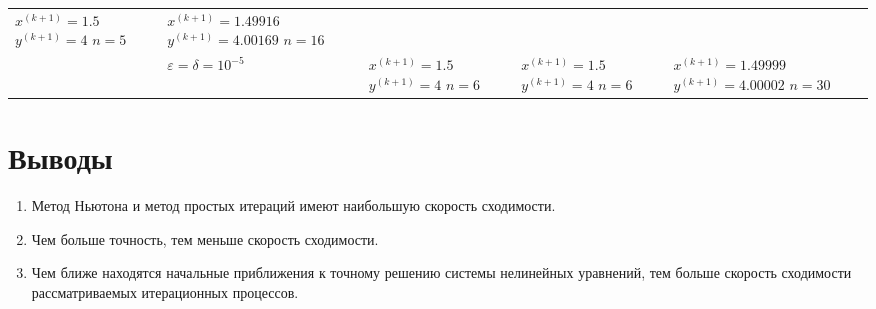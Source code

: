 \begin{table}[h!]
\begin{tabular}{|p{12ex}|l|p{20ex}|p{20ex}|p{20ex}|}
		\(x^{(k+1)}=1.5\) \newline \(y^{(k+1)}=4\) \newline\(n=5\) &                                                                                                               %
		\(x^{(k+1)}=1.49916\) \newline \(y^{(k+1)}=4.00169\) \newline\(n=16\)                                                                                                      \\ \cline{2-5}
		                                                           & \(\varepsilon = \delta = 10^{-5} \) &                                                                         %
		\(x^{(k+1)}=1.5\) \newline \(y^{(k+1)}=4\) \newline\(n=6\) &                                                                                                               %
		\(x^{(k+1)}=1.5\) \newline \(y^{(k+1)}=4\) \newline\(n=6\) &                                                                                                               %
		\(x^{(k+1)}=1.49999\) \newline \(y^{(k+1)}=4.00002\) \newline\(n=30\)                                                                                                      \\ \hline
	\end{tabular}
\end{table}


\section{Выводы}
\begin{enumerate}
	\item Метод Ньютона и метод простых итераций имеют наибольшую скорость сходимости.
	\item Чем больше точность, тем меньше скорость сходимости.
	\item Чем ближе находятся начальные приближения к точному решению системы нелинейных уравнений, тем больше скорость сходимости рассматриваемых итерационных процессов.
\end{enumerate}
